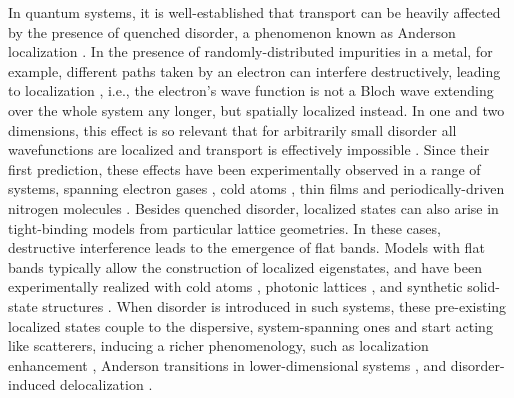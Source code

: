 \documentclass[prl,aps,twocolumn,showpacs,superscriptaddress,longbibliography]{revtex4-1}
\begin{document}
%


In quantum systems, it is well-established that transport can be heavily affected by the presence of quenched disorder, a phenomenon known as Anderson localization \cite{Anderson1958}. In the presence of randomly-distributed impurities in a metal, for example, different paths taken by an electron can interfere destructively, leading to localization , i.e., the electron's wave function is not a Bloch wave extending over the whole system any longer, but spatially localized instead. In one and two dimensions, this effect is so relevant that for arbitrarily small disorder all wavefunctions are localized and transport is effectively impossible \cite{Mott1961,Ishii1973}. Since their first prediction, these effects have been experimentally observed in a range of systems, spanning electron gases \cite{Cutler:1969}, cold atoms \cite{Billy:2008,Roati:2008,Semeghini:2015}, thin films \cite{Liao:2015} and periodically-driven nitrogen molecules \cite{Bitter:2016}. Besides quenched disorder, localized states can also arise in tight-binding models from particular lattice geometries. In these cases, destructive interference leads to the emergence of flat bands. Models with flat bands typically allow the construction of localized eigenstates, and have been experimentally realized with cold atoms \cite{Shen2010}, photonic lattices \cite{Mukherjee2015}, and synthetic solid-state structures \cite{slot2017, drost2017}. When disorder is introduced in such systems, these pre-existing localized states couple to the dispersive, system-spanning ones and start acting like scatterers, inducing a richer phenomenology, such as localization enhancement \cite{Leykam2017}, Anderson transitions in lower-dimensional systems \cite{Bodyfelt2014}, and disorder-induced delocalization \cite{Goda2006}.
\end{document}
